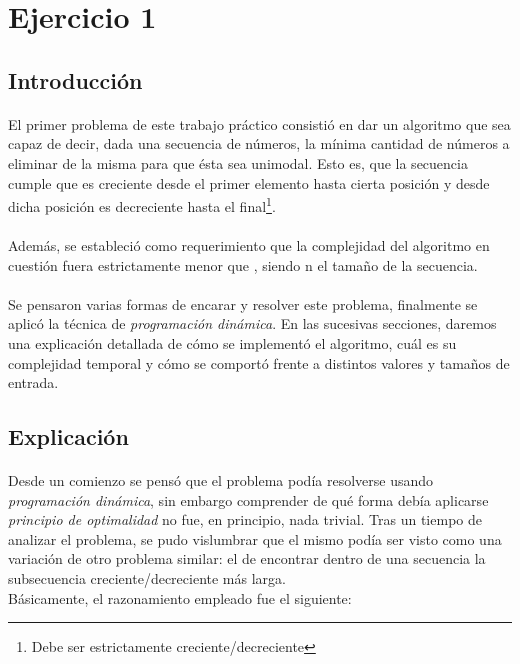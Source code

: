 \section{Ejercicio 1}

\subsection{Introducción}

\paragraph{}
El primer problema de este trabajo práctico consistió en dar un algoritmo que sea capaz de decir, dada una secuencia de números, la mínima cantidad de números a eliminar de la misma para que ésta sea unimodal. Esto es, que la secuencia cumple que es creciente desde el primer elemento hasta cierta posición y desde dicha posición es decreciente hasta el final\footnote{Debe ser estrictamente creciente/decreciente}.

\paragraph{}
Además, se estableció como requerimiento que la complejidad del algoritmo en cuestión fuera estrictamente menor que , siendo n el tamaño de la secuencia.

\paragraph{}
Se pensaron varias formas de encarar y resolver este problema, finalmente se aplicó la técnica de \textit{programación dinámica}. En las sucesivas secciones, daremos una explicación detallada de cómo se implementó el algoritmo, cuál es su complejidad temporal y cómo se comportó frente a distintos valores y tamaños de entrada.


\subsection{Explicación}

\paragraph{}
Desde un comienzo se pensó que el problema podía resolverse usando \textit{programación dinámica}, sin embargo comprender de qué forma debía aplicarse \textit{principio de optimalidad} no fue, en principio, nada trivial. Tras un tiempo de analizar el problema, se pudo vislumbrar que el mismo podía ser visto como una variación de otro problema similar: el de encontrar dentro de una secuencia la subsecuencia creciente/decreciente más larga. \\
Básicamente, el razonamiento empleado fue el siguiente:\\

